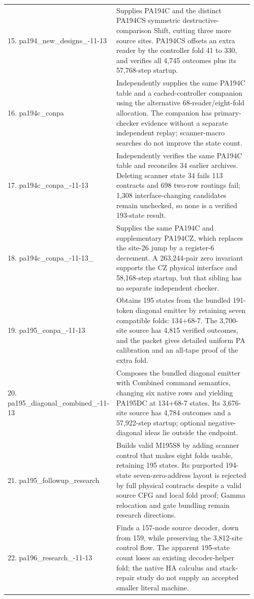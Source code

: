 \begin{longtable}{@{}p{0.35\linewidth}p{0.61\linewidth}@{}}
15. pa194\_\allowbreak new\_\allowbreak designs\_\allowbreak 2026-11-13 & Supplies PA194C and the distinct PA194CS symmetric destructive-comparison Shift, cutting three more source sites. PA194CS offsets an extra reader by the controller fold 41 to 330, and verifies all 4,745 outcomes plus its 57,768-step startup.\\[4pt]
16. pa194c\_\allowbreak conpa & Independently supplies the same PA194C table and a cached-controller companion using the alternative 68-reader/eight-fold allocation. The companion has primary-checker evidence without a separate independent replay; scanner-macro searches do not improve the state count.\\[4pt]
17. pa194c\_\allowbreak conpa\_\allowbreak 2026-11-13 & Independently verifies the same PA194C table and reconciles 34 earlier archives. Deleting scanner state 34 fails 113 contracts and 698 two-row routings fail; 1,308 interface-changing candidates remain unchecked, so none is a verified 193-state result.\\[4pt]
18. pa194c\_\allowbreak conpa\_\allowbreak 2026-11-13\_\allowbreak 1 & Supplies the same PA194C and supplementary PA194CZ, which replaces the site-26 jump by a register-6 decrement. A 263,244-pair zero invariant supports the CZ physical interface and 58,168-step startup, but that sibling has no separate independent checker.\\[4pt]
19. pa195\_\allowbreak conpa\_\allowbreak 2026-11-13 & Obtains 195 states from the bundled 191-token diagonal emitter by retaining seven compatible folds: 134+68-7. The 3,700-site source has 4,815 verified outcomes, and the packet gives detailed uniform PA calibration and an all-tape proof of the extra fold.\\[4pt]
20. pa195\_\allowbreak diagonal\_\allowbreak combined\_\allowbreak 2026-11-13 & Composes the bundled diagonal emitter with Combined command semantics, changing six native rows and yielding PA195DC at 134+68-7 states. Its 3,676-site source has 4,784 outcomes and a 57,922-step startup; optional negative-diagonal ideas lie outside the endpoint.\\[4pt]
21. pa195\_\allowbreak followup\_\allowbreak research & Builds valid M195S8 by adding scanner control that makes eight folds usable, retaining 195 states. Its purported 194-state seven-zero-address layout is rejected by full physical contracts despite a valid source CFG and local fold proof; Gamma relocation and gate bundling remain research directions.\\[4pt]
22. pa196\_\allowbreak research\_\allowbreak 2026-11-13 & Finds a 157-node source decoder, down from 159, while preserving the 3,812-site control flow. The apparent 195-state count loses an existing decoder-helper fold; the native HA calculus and stack-repair study do not supply an accepted smaller literal machine.\\[4pt]

\end{longtable}
